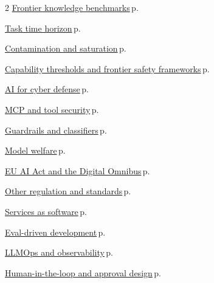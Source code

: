 \documentclass[10pt,a4paper,openany]{report}
\begin{document}
\begin{multicols}{2}
\hyperref[c:evals-6]{Frontier knowledge benchmarks}\,{\color{muted}\scriptsize p.\,\pageref{c:evals-6}}\par\vspace{1pt}
\hyperref[c:evals-8]{Task time horizon}\,{\color{muted}\scriptsize p.\,\pageref{c:evals-8}}\par\vspace{1pt}
\hyperref[c:evals-10]{Contamination and saturation}\,{\color{muted}\scriptsize p.\,\pageref{c:evals-10}}\par\vspace{1pt}
\hyperref[c:safety-0]{Capability thresholds and frontier safety frameworks}\,{\color{muted}\scriptsize p.\,\pageref{c:safety-0}}\par\vspace{1pt}
\hyperref[c:safety-1]{AI for cyber defense}\,{\color{muted}\scriptsize p.\,\pageref{c:safety-1}}\par\vspace{1pt}
\hyperref[c:safety-4]{MCP and tool security}\,{\color{muted}\scriptsize p.\,\pageref{c:safety-4}}\par\vspace{1pt}
\hyperref[c:safety-5]{Guardrails and classifiers}\,{\color{muted}\scriptsize p.\,\pageref{c:safety-5}}\par\vspace{1pt}
\hyperref[c:safety-10]{Model welfare}\,{\color{muted}\scriptsize p.\,\pageref{c:safety-10}}\par\vspace{1pt}
\hyperref[c:safety-11]{EU AI Act and the Digital Omnibus}\,{\color{muted}\scriptsize p.\,\pageref{c:safety-11}}\par\vspace{1pt}
\hyperref[c:safety-12]{Other regulation and standards}\,{\color{muted}\scriptsize p.\,\pageref{c:safety-12}}\par\vspace{1pt}
\hyperref[c:practice-2]{Services as software}\,{\color{muted}\scriptsize p.\,\pageref{c:practice-2}}\par\vspace{1pt}
\hyperref[c:practice-4]{Eval-driven development}\,{\color{muted}\scriptsize p.\,\pageref{c:practice-4}}\par\vspace{1pt}
\hyperref[c:practice-5]{LLMOps and observability}\,{\color{muted}\scriptsize p.\,\pageref{c:practice-5}}\par\vspace{1pt}
\hyperref[c:practice-6]{Human-in-the-loop and approval design}\,{\color{muted}\scriptsize p.\,\pageref{c:practice-6}}\par\vspace{1pt}
\end{multicols}
\end{document}
